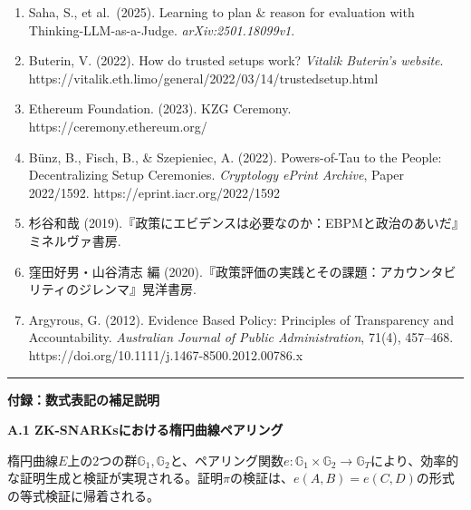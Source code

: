 \begin{enumerate}
\item
  Saha, S., et al.~(2025). Learning to plan \& reason for evaluation with Thinking-LLM-as-a-Judge. \emph{arXiv:2501.18099v1}.
\item
  Buterin, V. (2022). How do trusted setups work? \emph{Vitalik Buterin's website}. https://vitalik.eth.limo/general/2022/03/14/trustedsetup.html
\item
  Ethereum Foundation. (2023). KZG Ceremony. https://ceremony.ethereum.org/
\item
  Bünz, B., Fisch, B., \& Szepieniec, A. (2022). Powers-of-Tau to the People: Decentralizing Setup Ceremonies. \emph{Cryptology ePrint Archive}, Paper 2022/1592. https://eprint.iacr.org/2022/1592
\item
  杉谷和哉 (2019).『政策にエビデンスは必要なのか：EBPMと政治のあいだ』ミネルヴァ書房.
\item
  窪田好男・山谷清志 編 (2020).『政策評価の実践とその課題：アカウンタビリティのジレンマ』晃洋書房.
\item
  Argyrous, G. (2012). Evidence Based Policy: Principles of Transparency and Accountability. \emph{Australian Journal of Public Administration}, 71(4), 457--468. https://doi.org/10.1111/j.1467-8500.2012.00786.x
\end{enumerate}

\begin{center}\rule{0.5\linewidth}{0.5pt}\end{center}

\textbf{付録：数式表記の補足説明}

\textbf{A.1 ZK-SNARKsにおける楕円曲線ペアリング}

楕円曲線\(E\)上の2つの群\(\mathbb{G}_1, \mathbb{G}_2\)と、ペアリング関数\(e: \mathbb{G}_1 \times \mathbb{G}_2 \rightarrow \mathbb{G}_T\)により、効率的な証明生成と検証が実現される。証明\(\pi\)の検証は、\(e(A, B) = e(C, D)\)の形式の等式検証に帰着される。


\printbibliography[heading=subbibliography,title={章末参考文献}]
